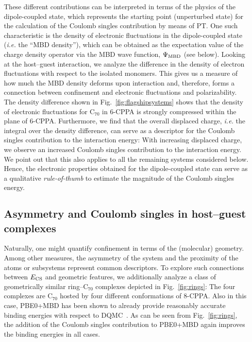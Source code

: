 \documentclass[aps,prl,groupaddress, twocolumn]{revtex4-1}  %
\begin{document}
These different contributions can be interpreted in terms of the physics of the dipole-coupled state, which represents the starting point (unperturbed state) for the calculation of the Coulomb singles contribution by means of PT\@.
One such characteristic is the density of electronic fluctuations in the dipole-coupled state (\textit{i.e.} the ``MBD density''), which can be obtained as the expectation value of the charge density operator via the MBD wave function, $\Psi_{\rm MBD}$ (see below).
Looking at the host--guest interaction, we analyze the difference in the density of electron fluctuations with respect to the isolated monomers.
This gives us a measure of how much the MBD density deforms upon interaction and, therefore, forms a connection between confinement and electronic fluctuations and polarizability.
The density difference shown in Fig.~\ref{fig:flagshipsystems} %
shows that the density of electronic fluctuations for C$_{70}$ in 6-CPPA is strongly compressed within the plane of 6-CPPA\@.
Furthermore, we find that the overall displaced charge, \textit{i.e.} the integral over the density difference, can serve as a descriptor for the Coulomb singles contribution to the interaction energy:
With increasing displaced charge, we observe an increased Coulomb singles contribution to the interaction energy. We point out that this also applies to all the remaining systems considered below.
Hence, the electronic properties obtained for the dipole-coupled state can serve as a qualitative \emph{rule-of-thumb} to estimate the magnitude of the Coulomb singles energy.

\subsection*{Asymmetry and Coulomb singles in host--guest complexes}

 Naturally, one might quantify confinement in terms of the (molecular) geometry. Among other measures, the asymmetry of the system and the proximity of the atoms or subsystems represent common descriptors. To explore such connections between $E_{\rm CS}$ and geometric features, we additionally analyze a class of geometrically similar ring--C$_{70}$ complexes depicted in Fig.~\ref{fig:rings}: The four complexes are C$_{70}$ hosted by four different conformations of 8-CPPA.
Also in this case, PBE0+MBD has been shown to already provide reasonably accurate binding energies with respect to DQMC~\cite{hermann_ncomm2017}. As can be seen from Fig.~\ref{fig:rings}, the addition of the Coulomb singles contribution to PBE0+MBD again improves the binding energies in all cases.
\end{document}
